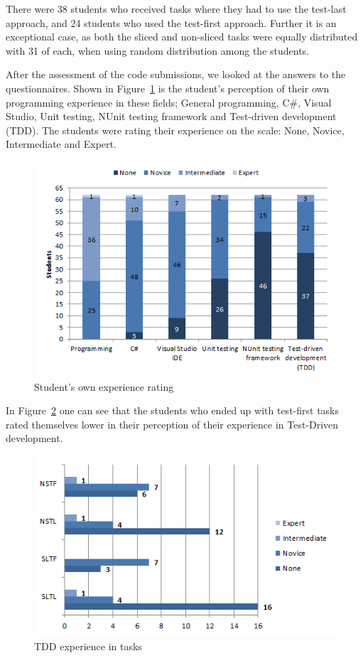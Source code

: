 \documentclass{sig-alternate-05-2015}
\begin{document}
There were 38 students who received tasks where they had to use the test-last approach, and 24 students who used the test-first approach. Further it is an exceptional case, as both the sliced and non-sliced tasks were equally distributed with 31 of each, when using random distribution among the students.

After the assessment of the code submissions, we looked at the answers to the questionnaires. Shown in Figure~\ref{fig:Student's own experience rating} is the student's perception of their own programming experience in these fields; General programming, C{\#}, Visual Studio, Unit testing, NUnit testing framework and Test-driven development (TDD).
The students were rating their experience on the scale: None, Novice, Intermediate and Expert.

\begin{figure}[!ht]
	\centering
	\includegraphics[width=1\linewidth]{img03}
	\caption{Student's own experience rating}
	\label{fig:Student's own experience rating}
\end{figure}

In Figure~\ref{fig:TDD experience in tasks} one can see that the students who ended up with test-first tasks rated themselves lower in their perception of their experience in Test-Driven development.

\begin{figure}[!ht]
	\centering
	\includegraphics[width=1\linewidth]{img04}
	\caption{TDD experience in tasks}
	\label{fig:TDD experience in tasks}
\end{figure}
\end{document}
